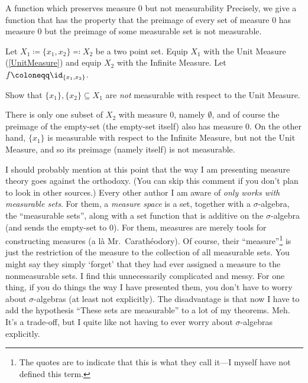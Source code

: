 \begin{exm}{A function which preserves measure $0$ but not measurability}{}
Precisely, we give a function that has the property that the preimage of every set of measure $0$ has measure $0$ but the preimage of some measurable set is not measurable.

Let $X_1\coloneqq \{ x_1,x_2\} \eqqcolon X_2$ be a two point set.  Equip $X_1$ with the Unit Measure (\cref{UnitMeasure}) and equip $X_2$ with the Infinite Measure.  Let $f\coloneqq \id _{\{ x_1,x_2\}}$.
\begin{exr}[breakable=false]{}{}
Show that $\{ x_1\} ,\{ x_2\} \subseteq X_1$ are \emph{not} measurable with respect to the Unit Measure.
\end{exr}

There is only one subset of $X_2$ with measure $0$, namely $\emptyset$, and of course the preimage of the empty-set (the empty-set itself) also has measure $0$.  On the other hand, $\{ x_1\}$ is measurable with respect to the Infinite Measure, but not the Unit Measure, and so its preimage (namely itself) is not measurable.
\end{exm}

\begin{displayquote}
I should probably mention at this point that the way I am presenting measure theory goes against the orthodoxy.  (You can skip this comment if you don't plan to look in other sources.)  Every other author I am aware of \emph{only works with measurable sets}.  For them, a \emph{measure space} is a set, together with a $\sigma$-algebra, the ``measurable sets'', along with a set function that is additive on the $\sigma$-algebra (and sends the empty-set to $0$).  For them, measures are merely tools for constructing measures (a l\`{a} Mr.~Carathéodory).  Of course, their ``measure''\footnote{The quotes are to indicate that this is what they call it---I myself have not defined this term.} is just the restriction of the measure to the collection of all measurable sets.  You might say they simply `forget' that they had ever assigned a measure to the nonmeasurable sets.  I find this unnecessarily complicated and messy.  For one thing, if you do things the way I have presented them, you don't have to worry about $\sigma$-algebras (at least not explicitly).  The disadvantage is that now I have to add the hypothesis ``These sets are measurable'' to a lot of my theorems.  Meh.  It's a trade-off, but I quite like not having to ever worry about $\sigma$-algebras explicitly.
\end{displayquote}

